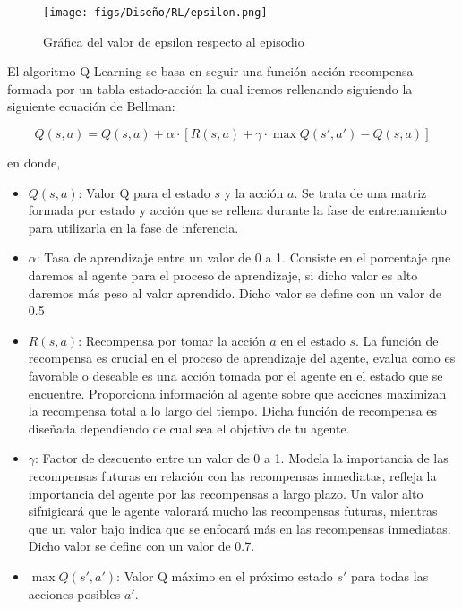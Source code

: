 \begin{itemize}
 \begin{figure} [H]
  \begin{center}
    \texttt{[image: figs/Diseño/RL/epsilon.png]}
  \end{center}
  \caption{Gráfica del valor de epsilon respecto al episodio}
  \label{fig:epsilon}
\end{figure}
  \end{itemize}

  El algoritmo Q-Learning se basa en seguir una función acción-recompensa formada por un tabla estado-acción la cual iremos rellenando siguiendo la siguiente ecuación
  de Bellman\cite{Bellman}:
  
  \begin{equation}
    Q(s, a) = Q(s, a) + \alpha \cdot [R(s, a) + \gamma \cdot \max Q(s', a') - Q(s, a)]
  \end{equation}

  en donde, 

  \begin{itemize}
    \item \textbf{$Q(s, a)$}: Valor Q para el estado $s$ y la acción $a$. Se trata de una matriz formada por estado y acción que se rellena durante la fase de entrenamiento para utilizarla
    en la fase de inferencia.
    \item \textbf{$\alpha$}: Tasa de aprendizaje entre un valor de 0 a 1. Consiste en el porcentaje que daremos al agente para el proceso de aprendizaje, 
    si dicho valor es alto daremos más peso al valor aprendido. Dicho valor se define con un valor de 0.5 
    \item \textbf{$R(s, a)$}: Recompensa por tomar la acción $a$ en el estado $s$. La función de recompensa es crucial en el proceso de aprendizaje del agente, evalua como es favorable o deseable
    es una acción tomada por el agente en el estado que se encuentre. Proporciona información al agente sobre que acciones maximizan la recompensa total a lo largo del tiempo. Dicha función
    de recompensa es diseñada dependiendo de cual sea el objetivo de tu agente. 
    \item \textbf{$\gamma$}: Factor de descuento entre un valor de 0 a 1. Modela la importancia de las recompensas futuras en relación con las recompensas inmediatas, refleja la importancia del agente
    por las recompensas a largo plazo. Un valor alto sifnigicará que le agente valorará mucho las recompensas futuras, mientras que un valor bajo indica que se enfocará más en las recompensas
    inmediatas. Dicho valor se define con un valor de 0.7.
    \item \textbf{$\max Q(s', a')$}: Valor Q máximo en el próximo estado $s'$ para todas las acciones posibles $a'$.
\end{itemize}

